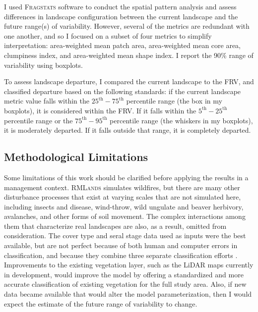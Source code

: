%
I used \textsc{Fragstats} software \citep{Fragstats2012} to conduct the spatial pattern analysis and assess differences in landscape configuration between the current landscape and the future range(s) of variability. However, several of the metrics are redundant with one another, and so I focused on a subset of four metrics to simplify interpretation: area-weighted mean patch area, area-weighted mean core area, clumpiness index, and area-weighted mean shape index. I report the 90\% range of variability using boxplots. %

To assess landscape departure, I compared the current landscape to the FRV, and classified departure based on the following standards: if the current landscape metric value falls within the $25^{\text{th}}-75^{\text{th}}$ percentile range (the box in my boxplots), it is considered within the FRV. If it falls within the $5^{\text{th}}-25^{\text{th}}$ percentile range or the $75^{\text{th}}-95^{\text{th}}$ percentile range (the whiskers in my boxplots), it is moderately departed. If it falls outside that range, it is completely departed.



\subsection*{Methodological Limitations} 
Some limitations of this work should be clarified before applying the results in a management context. \textsc{RMLands} simulates wildfires, but there are many other disturbance processes that exist at varying scales that are not simulated here, including insects and disease, wind-throw, wild ungulate and beaver herbivory, avalanches, and other forms of soil movement. The complex interactions among them that characterize real landscapes are also, as a result, omitted from consideration. %
The cover type and seral stage data used as inputs were the best available, but are not perfect because of both human and computer errors in classification, and because they combine three separate classification efforts \citep{USDAForestService2009}. Improvements to the existing vegetation layer, such as the LiDAR maps currently in development, would improve the model by offering a standardized and more accurate classification of existing vegetation for the full study area. Also, if new data became available that would alter the model parameterization, then I would expect the estimate of the future range of variability to change. 

